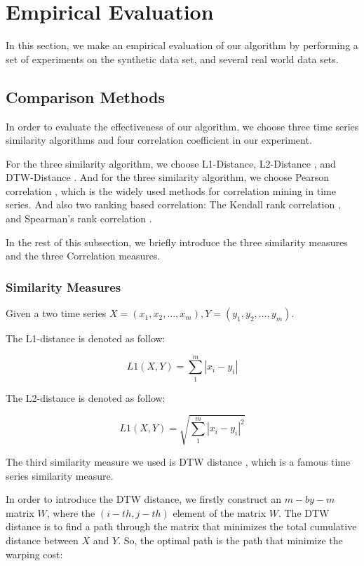 \section{Empirical Evaluation}
In this section, we make an empirical evaluation of our algorithm by performing a set of experiments on the synthetic data set, and several real world data sets.

\subsection{Comparison Methods}
In order to evaluate the effectiveness of our algorithm, we choose three time series similarity algorithms and four correlation coefficient in our experiment. 

For the three similarity algorithm, we choose L1-Distance, L2-Distance \cite{han2011data}, and DTW-Distance \cite{muller2007dynamic}. 
And for the three similarity algorithm, we choose Pearson correlation \cite{nagelkerke1991note}, which is the widely used methods for correlation mining in time series. And also two ranking based correlation: The Kendall rank correlation \cite{kendall1938new}, and Spearman's rank correlation \cite{pirie1988spearman}.

In the rest of this subsection, we briefly introduce the three similarity measures and the three Correlation measures.
 
\subsubsection{Similarity Measures}

Given a two time series 
$X=(x_1,x_2,...,x_m),Y=(y_1,y_2,...,y_m)$.

The L1-distance is denoted as follow:

\begin{equation}
L1(X,Y) = \sum_{1}^{m}|x_i-y_i|
\end{equation}

The L2-distance is denoted as follow:

\begin{equation}
L1(X,Y) = \sqrt{\sum_{1}^{m}|x_i-y_i|^2}
\end{equation}

The third similarity measure we used is DTW distance \cite{muller2007dynamic}, which is a famous time series similarity measure.

In order to introduce the DTW distance, we firstly construct an $m-by-m$ matrix $W$, where the $(i-{th},j-{th})$ element of the matrix $W$. The DTW distance is to find a path through the matrix that minimizes the total cumulative distance between $X$ and $Y$. 
So, the optimal path is the path that minimize the warping cost:

